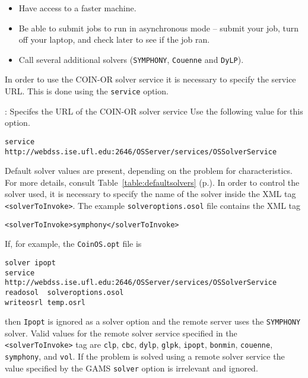 \begin{itemize}
\item Have access to a faster machine.

\item  Be able to  submit jobs to run in asynchronous mode -- submit your job,  turn off your laptop,  
and check later to see if the job ran.

\item Call several additional solvers ({\tt SYMPHONY}, {\tt Couenne} and {\tt DyLP}).

\end{itemize}

In order to use  the COIN-OR solver service it is necessary to specify the service URL. 
This is done using the {\tt service} option.

\vskip 8pt
: Specifes the URL of  the COIN-OR solver service
\vskip 8pt
Use the following value for this option.
\begin{verbatim}
service http://webdss.ise.ufl.edu:2646/OSServer/services/OSSolverService
\end{verbatim}

Default solver values are present, depending on the problem for characteristics. For more details, consult 
Table~\ref{table:defaultsolvers} (p.\pageref{table:defaultsolvers}).
In order to control the solver used, it is necessary to specify the name of the solver
inside the XML tag {\tt <solverToInvoke>}. The example  {\tt solveroptions.osol} file contains the XML tag
\begin{verbatim}
<solverToInvoke>symphony</solverToInvoke>
\end{verbatim}
If, for example,  the {\tt CoinOS.opt} file is
\begin{verbatim}
solver ipopt
service http://webdss.ise.ufl.edu:2646/OSServer/services/OSSolverService
readosol  solveroptions.osol
writeosrl temp.osrl
\end{verbatim}
then {\tt Ipopt} is ignored as a solver option and the remote server uses the {\tt  SYMPHONY} solver.  
Valid values for the remote solver service specified in the {\tt <solverToInvoke>} tag are {\tt clp},  
{\tt cbc},  {\tt dylp}, {\tt glpk}, {\tt ipopt}, {\tt bonmin},   {\tt couenne},  {\tt symphony}, and 
{\tt vol}.  If the problem is solved using a remote solver service the value specified by the GAMS {\tt solver} option is irrelevant and ignored. 

